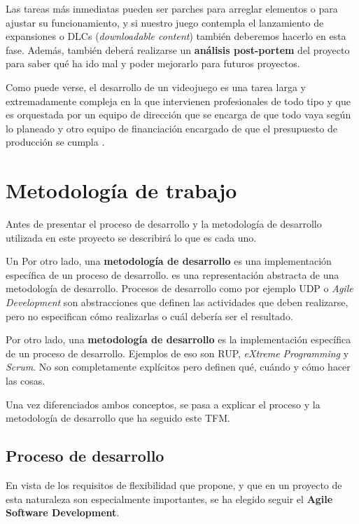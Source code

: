 Las tareas más inmediatas pueden ser parches para arreglar elementos o para ajustar su funcionamiento, y si nuestro juego contempla el lanzamiento de expansiones o DLCs (\textit{downloadable content}) también deberemos hacerlo en esta fase. Además, también deberá realizarse un \textbf{análisis post-portem} del proyecto para saber qué ha ido mal y poder mejorarlo para futuros proyectos.

Como puede verse, el desarrollo de un videojuego es una tarea larga y extremadamente compleja en la que intervienen profesionales de todo tipo y que es orquestada por un equipo de dirección que se encarga de que todo vaya según lo planeado y otro equipo de financiación encargado de que el presupuesto de producción se cumpla \cite{man-14}.

\section{Metodología de trabajo}

Antes de presentar el proceso de desarrollo y la metodología de desarrollo utilizada en este proyecto se describirá lo que es cada uno.

Un Por otro lado, una \textbf{metodología de desarrollo} es una implementación específica de un proceso de desarrollo. es una representación abstracta de una metodología de desarrollo. Procesos de desarrollo como por ejemplo \acs{UDP} o \textit{Agile Development} son abstracciones que definen las actividades que deben realizarse, pero no especifican cómo realizarlas o cuál debería ser el resultado.

Por otro lado, una \textbf{metodología de desarrollo} es la implementación específica de un proceso de desarrollo. Ejemplos de eso son \acs{RUP}, \textit{eXtreme Programming} y \textit{Scrum}. No son completamente explícitos pero definen qué, cuándo y cómo hacer las cosas.

Una vez diferenciados ambos conceptos, se pasa a explicar el proceso y la metodología de desarrollo que ha seguido este \acs{TFM}.

\subsection{Proceso de desarrollo}

En vista de los requisitos de flexibilidad que propone, y que en un proyecto de esta naturaleza son especialmente importantes, se ha elegido seguir el \textbf{Agile Software Development}.

